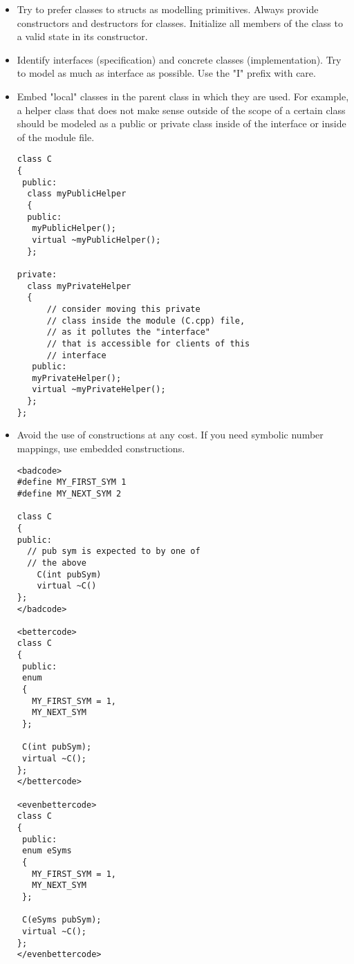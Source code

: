 \begin{itemize}
\item Try to prefer classes to structs as modelling primitives.
Always provide constructors and destructors for classes.
Initialize all members of the class to a valid state in its constructor.
\item Identify interfaces (specification) and concrete classes (implementation).
Try to model as much as interface as possible.
Use the "I" prefix with care.
\item Embed "local" classes in the parent class in which they are used.
For example, a helper class that does not make sense outside of the scope of a certain class should be modeled as a public or private class inside of the interface or inside of the module file.
\begin{verbatim}
class C
{
 public:
  class myPublicHelper 
  {
  public:
   myPublicHelper();
   virtual ~myPublicHelper();
  };
  
private:
  class myPrivateHelper
  {
	  // consider moving this private
	  // class inside the module (C.cpp) file,
	  // as it pollutes the "interface"
	  // that is accessible for clients of this
	  // interface
   public:
   myPrivateHelper();
   virtual ~myPrivateHelper();
  };
};
\end{verbatim}

\item Avoid the use of  constructions at any cost.
If you need symbolic number mappings, use embedded  constructions.
\begin{verbatim}
<badcode>
#define MY_FIRST_SYM 1
#define MY_NEXT_SYM 2

class C
{
public:
  // pub sym is expected to by one of
  // the above
	C(int pubSym)
	virtual ~C()
};
</badcode>

<bettercode>
class C
{
 public:
 enum
 {
   MY_FIRST_SYM = 1,
   MY_NEXT_SYM
 };
 
 C(int pubSym);
 virtual ~C();
};
</bettercode>

<evenbettercode>
class C
{
 public:
 enum eSyms
 {
   MY_FIRST_SYM = 1,
   MY_NEXT_SYM
 };
 
 C(eSyms pubSym);
 virtual ~C();
};
</evenbettercode>
\end{verbatim}
\end{itemize}

